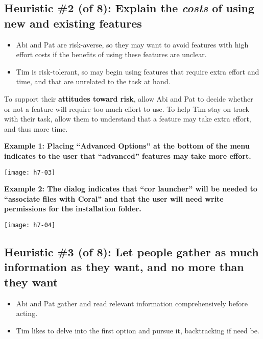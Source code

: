 \subsection{Heuristic \#2 (of 8): Explain the \textit{costs} of using new and existing features}

\begin{itemize}
    \item Abi and Pat are risk-averse, so they may want to avoid features with high effort costs if the benefits of using these features are unclear.
    \item Tim is risk-tolerant, so may begin using features that require extra effort and time, and that are unrelated to the task at hand.
\end{itemize}

\noindent To support their \textbf{attitudes toward risk}, allow Abi and Pat to decide whether or not a feature will require too much effort to use. To help Tim stay on track with their task, allow them to understand that a feature may take extra effort, and thus more time.

\spacer
\noindent\textbf{Example 1: Placing ``Advanced Options'' at the bottom of the menu indicates to the user that ``advanced'' features may take more effort.}\\
\begin{center}
\noindent\texttt{[image: h7-03]}
\end{center}

\noindent\textbf{Example 2: The dialog indicates that ``cor launcher'' will be needed to ``associate files with Coral'' and that the user will need write permissions for the installation folder.}\\
\begin{center}
\noindent\texttt{[image: h7-04]}
\end{center}

\subsection{Heuristic \#3 (of 8): Let people gather as much information as they want, and no more than they want}

\begin{itemize}
\item Abi and Pat gather and read relevant information comprehensively before acting.
\item Tim likes to delve into the first option and pursue it, backtracking if need be.
\end{itemize}

